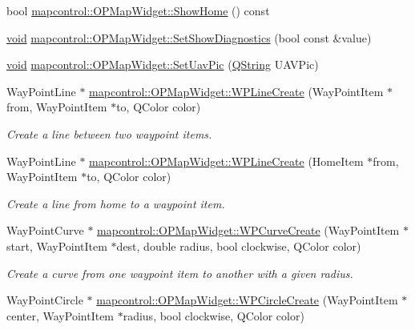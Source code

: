 \begin{DoxyCompactItemize}
\item 
bool \hyperlink{group___o_p_map_widget_ga0479c8181e84aade1b9a3eac69daf0b6}{mapcontrol\-::\-O\-P\-Map\-Widget\-::\-Show\-Home} () const 
\item 
\hyperlink{group___u_a_v_objects_plugin_ga444cf2ff3f0ecbe028adce838d373f5c}{void} \hyperlink{group___o_p_map_widget_gabf19ca6f76133841be5fedfff841073e}{mapcontrol\-::\-O\-P\-Map\-Widget\-::\-Set\-Show\-Diagnostics} (bool const \&value)
\item 
\hyperlink{group___u_a_v_objects_plugin_ga444cf2ff3f0ecbe028adce838d373f5c}{void} \hyperlink{group___o_p_map_widget_ga6413251a1bea12088cdfa6d7f599ba04}{mapcontrol\-::\-O\-P\-Map\-Widget\-::\-Set\-Uav\-Pic} (\hyperlink{group___u_a_v_objects_plugin_gab9d252f49c333c94a72f97ce3105a32d}{\-Q\-String} \-U\-A\-V\-Pic)
\item 
\-Way\-Point\-Line $\ast$ \hyperlink{group___o_p_map_widget_gaf6d0234b2aa0e66f40f4da7bc3b9fb4f}{mapcontrol\-::\-O\-P\-Map\-Widget\-::\-W\-P\-Line\-Create} (\-Way\-Point\-Item $\ast$from, \-Way\-Point\-Item $\ast$to, \-Q\-Color color)
\begin{DoxyCompactList}\small\item\em \-Create a line between two waypoint items. \end{DoxyCompactList}\item 
\-Way\-Point\-Line $\ast$ \hyperlink{group___o_p_map_widget_gada64bfaa4e838335d8b923e9e184b373}{mapcontrol\-::\-O\-P\-Map\-Widget\-::\-W\-P\-Line\-Create} (\-Home\-Item $\ast$from, \-Way\-Point\-Item $\ast$to, \-Q\-Color color)
\begin{DoxyCompactList}\small\item\em \-Create a line from home to a waypoint item. \end{DoxyCompactList}\item 
\-Way\-Point\-Curve $\ast$ \hyperlink{group___o_p_map_widget_ga18e61fa069c17e42dd0d6743e1e24ce4}{mapcontrol\-::\-O\-P\-Map\-Widget\-::\-W\-P\-Curve\-Create} (\-Way\-Point\-Item $\ast$start, \-Way\-Point\-Item $\ast$dest, double radius, bool clockwise, \-Q\-Color color)
\begin{DoxyCompactList}\small\item\em \-Create a curve from one waypoint item to another with a given radius. \end{DoxyCompactList}\item 
\-Way\-Point\-Circle $\ast$ \hyperlink{group___o_p_map_widget_ga8843daa4f0da4fe9343c9cee78bd6a1d}{mapcontrol\-::\-O\-P\-Map\-Widget\-::\-W\-P\-Circle\-Create} (\-Way\-Point\-Item $\ast$center, \-Way\-Point\-Item $\ast$radius, bool clockwise, \-Q\-Color color)

\end{DoxyCompactItemize}
